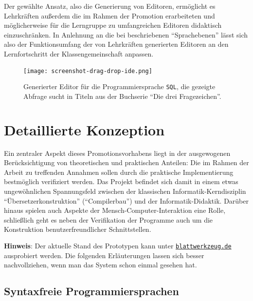 \documentclass[paper=a4,fontsize=11pt,parskip=half]{scrartcl}
\begin{document}
Der gewählte Ansatz, also die Generierung von Editoren, ermöglicht es Lehrkräften außerdem die im Rahmen der Promotion erarbeiteten und möglicherweise für die Lerngruppe zu umfangreichen Editoren didaktisch einzuschränken. In Anlehnung an die bei \cite{klaeren_macht_2007} beschriebenen \enquote{Sprachebenen} lässt sich also der Funktionsumfang der von Lehrkräften generierten Editoren an den Lernfortschritt der Klassengemeinschaft anpassen.

\begin{figure}[h]
  \centering\texttt{[image: screenshot-drag-drop-ide.png]}
  \caption{Generierter Editor für die Programmiersprache \texttt{SQL}, die gezeigte Abfrage sucht in Titeln aus der Buchserie \enquote{Die drei Fragezeichen}.}
  \label{fig:example-sql-ide}
\end{figure}

\clearpage

\restoregeometry
{}
\pagestyle{plain}

\section{Detaillierte Konzeption}

Ein zentraler Aspekt dieses Promotionsvorhabens liegt in der ausgewogenen Berücksichtigung von theoretischen und praktischen Anteilen: Die im Rahmen der Arbeit zu treffenden Annahmen sollen durch die praktische Implementierung bestmöglich verifiziert werden. Das Projekt befindet sich damit in einem etwas ungewöhnlichen Spannungsfeld zwischen der klassischen Informatik-Kerndisziplin \enquote{Übersetzerkonstruktion} (\enquote{Compilerbau}) und der Informatik-Didaktik. Darüber hinaus spielen auch Aspekte der Mensch-Computer-Interaktion eine Rolle, schließlich geht es neben der Verifikation der Programme auch um die Konstruktion benutzerfreundlicher Schnittstellen.

\begin{framed}
  \textbf{Hinweis}: Der aktuelle Stand des Prototypen kann unter \href{https://blattwerkzeug.de}{\texttt{blattwerkzeug.de}} ausprobiert werden. Die folgenden Erläuterungen lassen sich besser nachvollziehen, wenn man das System schon einmal gesehen hat.
\end{framed}

\subsection{Syntaxfreie Programmiersprachen}
\end{document}
